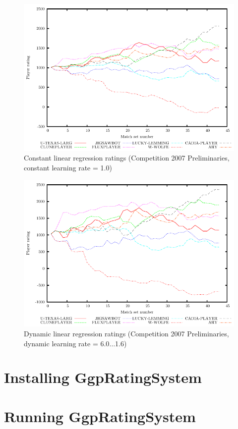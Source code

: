 \documentclass[a4paper,10pt]{article}
\begin{document}
\begin{figure}
 \centering
 \includegraphics[width=\textwidth]{constant_linear_regression_1_0}
 \caption{Constant linear regression ratings (Competition 2007 Preliminaries, constant learning rate = 1.0)}
 \label{fig:constant_linear_regression}
\end{figure}

\begin{figure}
 \centering
 \includegraphics[width=\textwidth]{dynamic_linear_regression_60}
 \caption{Dynamic linear regression ratings (Competition 2007 Preliminaries, dynamic learning rate = 6.0$\dotsc$1.6)}
 \label{fig:dynamic_linear_regression}
\end{figure}

\section{Installing GgpRatingSystem}

\section{Running GgpRatingSystem}
\end{document}
